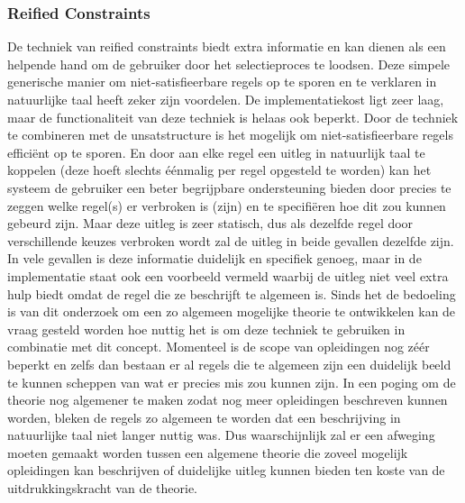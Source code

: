 \subsubsection{Reified Constraints}
De techniek van reified constraints biedt extra informatie en kan dienen als een helpende hand om de gebruiker door het selectieproces te loodsen. Deze simpele generische manier om niet-satisfieerbare regels op te sporen en te verklaren in natuurlijke taal heeft zeker zijn voordelen. De implementatiekost ligt zeer laag, maar de functionaliteit van deze techniek is helaas ook beperkt. Door de techniek te combineren met de unsatstructure is het mogelijk om niet-satisfieerbare regels effici\"{e}nt op te sporen. En door aan elke regel een uitleg in natuurlijk taal te koppelen (deze hoeft slechts \'{e}\'{e}nmalig per regel opgesteld te worden) kan het systeem de gebruiker een beter begrijpbare ondersteuning bieden door precies te zeggen welke regel(s) er verbroken is (zijn) en te specifi\"{e}ren hoe dit zou kunnen gebeurd zijn. Maar deze uitleg is zeer statisch, dus als dezelfde regel door verschillende keuzes verbroken wordt zal de uitleg in beide gevallen dezelfde zijn. In vele gevallen is deze informatie duidelijk en specifiek genoeg, maar in de implementatie staat ook een voorbeeld vermeld waarbij de uitleg niet veel extra hulp biedt omdat de regel die ze beschrijft te algemeen is. Sinds het de bedoeling is van dit onderzoek om een zo algemeen mogelijke theorie te ontwikkelen kan de vraag gesteld worden hoe nuttig het is om deze techniek te gebruiken in combinatie met dit concept. Momenteel is de scope van opleidingen nog z\'{e}\'{e}r beperkt en zelfs dan bestaan er al regels die te algemeen zijn een duidelijk beeld te kunnen scheppen van wat er precies mis zou kunnen zijn. In een poging om de theorie nog algemener te maken zodat nog meer opleidingen beschreven kunnen worden, bleken de regels zo algemeen te worden dat een beschrijving in natuurlijke taal niet langer nuttig was. Dus waarschijnlijk zal er een afweging moeten gemaakt worden tussen een algemene theorie die zoveel mogelijk opleidingen kan beschrijven of duidelijke uitleg kunnen bieden ten koste van de uitdrukkingskracht van de theorie.

